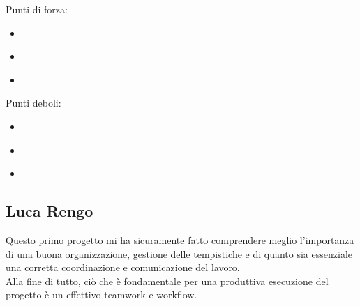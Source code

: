 \begin{flushleft}
	
	\textsf{\small Punti di forza:}\\
	
	\begin{itemize}
		\item \textsf{\small } %
		\item \textsf{\small }
		\item \textsf{\small }
	\end{itemize}
	
	\textsf{\small Punti deboli: }\\
	
	\begin{itemize}
		\item \textsf{\small } %
		\item \textsf{\small }
		\item \textsf{\small }
	\end{itemize}
	
\end{flushleft}


\subsection*{Luca Rengo}

\textsf{\small Questo primo progetto mi ha sicuramente fatto comprendere meglio l'importanza di una buona organizzazione, gestione delle tempistiche e di quanto sia essenziale una corretta coordinazione e comunicazione del lavoro.}\\
\textsf{\small Alla fine di tutto, ciò che è fondamentale per una produttiva esecuzione del progetto è un effettivo teamwork e workflow. } %

